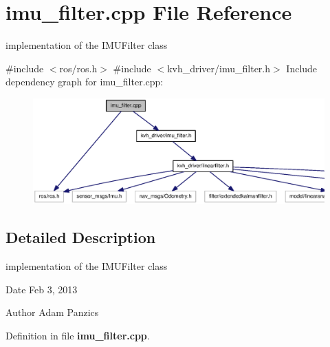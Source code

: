 \section{imu\-\_\-filter.\-cpp \-File \-Reference}
\label{imu__filter_8cpp}


implementation of the \-I\-M\-U\-Filter class  


{\ttfamily \#include $<$ros/ros.\-h$>$}\*
{\ttfamily \#include $<$kvh\-\_\-driver/imu\-\_\-filter.\-h$>$}\*
\-Include dependency graph for imu\-\_\-filter.\-cpp\-:
\nopagebreak
\begin{figure}[H]
\begin{center}
\leavevmode
\includegraphics[width=350pt]{imu__filter_8cpp__incl}
\end{center}
\end{figure}


\subsection{\-Detailed \-Description}
implementation of the \-I\-M\-U\-Filter class \begin{DoxyDate}{\-Date}
\-Feb 3, 2013 
\end{DoxyDate}
\begin{DoxyAuthor}{\-Author}
\-Adam \-Panzics 
\end{DoxyAuthor}


\-Definition in file {\bf imu\-\_\-filter.\-cpp}.

